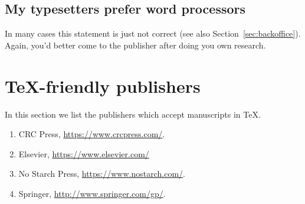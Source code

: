 \documentclass{article}
\begin{document}
\subsection{My typesetters prefer word processors}
\label{sec:typesetters}

In many cases this statement is just not correct (see also
Section~\ref{sec:backoffice}).  Again, you'd better come to the
publisher after doing you own research.

\section{\TeX-friendly publishers}
\label{sec:tex-aware-publishers}

In this section we list the publishers which accept manuscripts in
\TeX. 
\begin{enumerate}
\item CRC Press, \url{https://www.crcpress.com/}.  
\item Elsevier, \url{https://www.elsevier.com/}
\item No Starch Press, \url{https://www.nostarch.com/}.
\item Springer, \url{http://www.springer.com/gp/}.
\end{enumerate}




\end{document}
